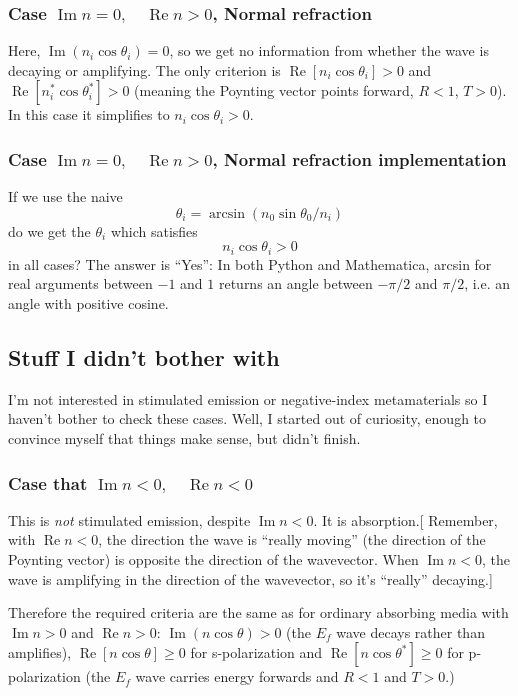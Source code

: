 \documentclass[12pt]{article}
\renewcommand{\(}{\left(}
\renewcommand{\)}{\right)}
\renewcommand{\Im}{\operatorname{Im}}
\renewcommand{\Re}{\operatorname{Re}}
\begin{document}
\subsubsection{Case $\Im n=0, \quad \Re n > 0$, Normal refraction}

Here, $\Im(n_i \cos \theta_i)=0$, so we get no information from whether the wave is decaying or amplifying. The only criterion is $\Re[n_i \cos\theta_i] > 0$ and $\Re [n_i^* \cos \theta_i^*]>0$ (meaning the Poynting vector points forward, $R<1$, $T>0$). In this case it simplifies to $n_i \cos\theta_i > 0$.

\subsubsection{Case $\Im n=0, \quad \Re n > 0$, Normal refraction implementation}
If we use the naive
$$\theta_i = \arcsin(n_0 \sin \theta_0 / n_i)$$
do we get the $\theta_i$ which satisfies
$$n_i \cos \theta_i>0$$
in all cases? The answer is ``Yes'': In both Python and Mathematica, arcsin for real arguments between $-1$ and $1$ returns an angle between $-\pi/2$ and $\pi/2$, i.e. an angle with positive cosine.

\subsection{Stuff I didn't bother with}

I'm not interested in stimulated emission or negative-index metamaterials so I haven't bother to check these cases. Well, I started out of curiosity, enough to convince myself that things make sense, but didn't finish.

\subsubsection{Case that $\Im n<0, \quad \Re n < 0$}

This is \emph{not} stimulated emission, despite $\Im n<0$. It is absorption.[ Remember, with $\Re n<0$, the direction the wave is ``really moving'' (the direction of the Poynting vector) is opposite the direction of the wavevector. When $\Im n<0$, the wave is amplifying in the direction of the wavevector, so it's ``really'' decaying.]

Therefore the required criteria are the same as for ordinary absorbing media with $\Im n>0$ and $\Re n > 0$: $\Im(n \cos \theta)>0$ (the $E_f$ wave decays rather than amplifies),  $\Re[n \cos\theta]\geq 0$ for s-polarization and $\Re[n \cos \theta^*]\geq 0$ for p-polarization (the $E_f$ wave carries energy forwards and $R<1$ and $T>0$.)
\end{document}
